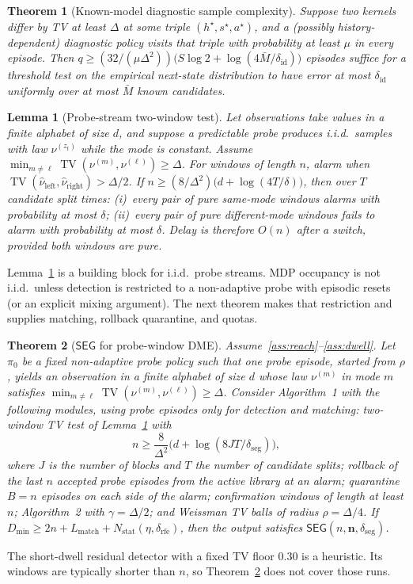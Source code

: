 \documentclass[11pt]{article}
\newtheorem{theorem}{Theorem}
\newtheorem{lemma}{Lemma}
\newcommand{\TV}{\operatorname{TV}}
\newcommand{\SEG}{\mathsf{SEG}}
\newcommand{\DME}{\textsc{DME}}
\newcommand{\deltaid}{\delta_{\mathrm{id}}}
\newcommand{\deltaseg}{\delta_{\mathrm{seg}}}
\newcommand{\deltarfe}{\delta_{\mathrm{rfe}}}
\begin{document}
\begin{theorem}[Known-model diagnostic sample complexity]
\label{thm:known-rate}
Suppose two kernels differ by TV at least $\Delta$ at some triple
$(h^\star,s^\star,a^\star)$, and a (possibly history-dependent) diagnostic
policy visits that triple with probability at least $\mu$ in every episode.
Then $q\ge (32/(\mu\Delta^2))\bigl(S\log 2+\log(4\bar M/\deltaid)\bigr)$
episodes suffice for a threshold test on the empirical next-state
distribution to have error at most $\deltaid$ uniformly over at most
$\bar M$ known candidates.
\end{theorem}

\begin{lemma}[Probe-stream two-window test]
\label{lem:twowindow}
Let observations take values in a finite alphabet of size $d$, and suppose a
predictable probe produces i.i.d.\ samples with law $\nu^{(z_t)}$ while the
mode is constant. Assume $\min_{m\neq\ell}\TV(\nu^{(m)},\nu^{(\ell)})\ge\Delta$.
For windows of length $n$, alarm when
$\TV(\widehat\nu_{\mathrm{left}},\widehat\nu_{\mathrm{right}})>\Delta/2$.
If $n\ge (8/\Delta^2)\bigl(d+\log(4T/\delta)\bigr)$, then over $T$ candidate
split times: (i)~every pair of pure same-mode windows alarms with probability
at most $\delta$; (ii)~every pair of pure different-mode windows fails to
alarm with probability at most $\delta$. Delay is therefore $O(n)$ after a
switch, provided both windows are pure.
\end{lemma}
Lemma~\ref{lem:twowindow} is a building block for i.i.d.\ probe streams. MDP
occupancy is not i.i.d.\ unless detection is restricted to a non-adaptive
probe with episodic resets (or an explicit mixing argument). The next theorem
makes that restriction and supplies matching, rollback quarantine, and
quotas.

\begin{theorem}[$\SEG$ for probe-window \DME]
\label{thm:seg-probe}
Assume~\ref{ass:reach}--\ref{ass:dwell}. Let $\pi_0$ be a fixed non-adaptive
probe policy such that one probe episode, started from $\rho$, yields an
observation in a finite alphabet of size $d$ whose law $\nu^{(m)}$ in mode
$m$ satisfies $\min_{m\neq\ell}\TV(\nu^{(m)},\nu^{(\ell)})\ge\Delta$.
Consider Algorithm~1 with the following modules, using probe episodes only
for detection and matching: two-window TV test of Lemma~\ref{lem:twowindow}
with
\[
n\ge\frac{8}{\Delta^2}\bigl(d+\log(8JT/\deltaseg)\bigr),
\]
where $J$ is the number of blocks and $T$ the number of candidate splits;
rollback of the last $n$ accepted probe episodes from the active library at
an alarm; quarantine $B=n$ episodes on each side of the alarm; confirmation
windows of length at least $n$; Algorithm~2 with $\gamma=\Delta/2$; and
Weissman TV balls of radius $\rho=\Delta/4$. If
$D_{\min}\ge 2n+L_{\mathrm{match}}+N_{\mathrm{stat}}(\eta,\deltarfe)$, then
the output satisfies $\SEG(n,\mathbf{n},\deltaseg)$.
\end{theorem}
The short-dwell residual detector with a fixed TV floor $0.30$ is a
heuristic. Its windows are typically shorter than $n$, so
Theorem~\ref{thm:seg-probe} does not cover those runs.
\end{document}
